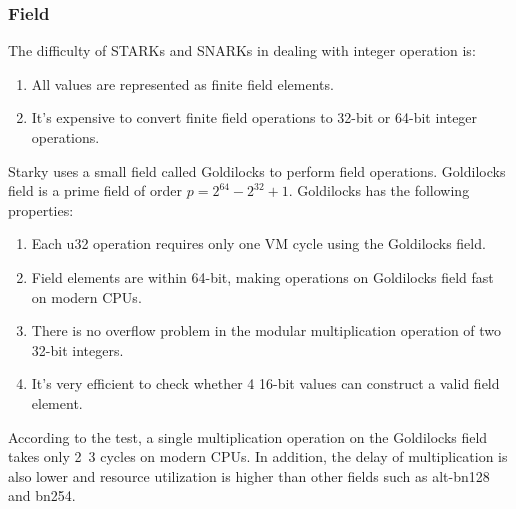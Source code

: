 \subsubsection{Field}\label{section: starky-field}

\noindent The difficulty of STARKs and SNARKs in dealing with integer operation is:

\begin{enumerate}
    \item All values are represented as finite field elements.
    \item It's expensive to convert finite field operations to 32-bit or 64-bit integer operations.
\end{enumerate}

Starky uses a small field called Goldilocks to perform field operations. Goldilocks field is a prime field of order $p = 2^{64} - 2^{32} + 1$. Goldilocks has the following properties:

\begin{enumerate}
    \item Each u32 operation requires only one VM cycle using the Goldilocks field.
    \item Field elements are within 64-bit, making operations on Goldilocks field fast on modern CPUs.
    \item There is no overflow problem in the modular multiplication operation of two 32-bit integers.
    \item It's very efficient to check whether 4 16-bit values can construct a valid field element.
\end{enumerate}

According to the test, a single multiplication operation on the Goldilocks field takes only 2~3 cycles on modern CPUs. In addition, the delay of multiplication is also lower and resource utilization is higher than other fields such as alt-bn128 and bn254.